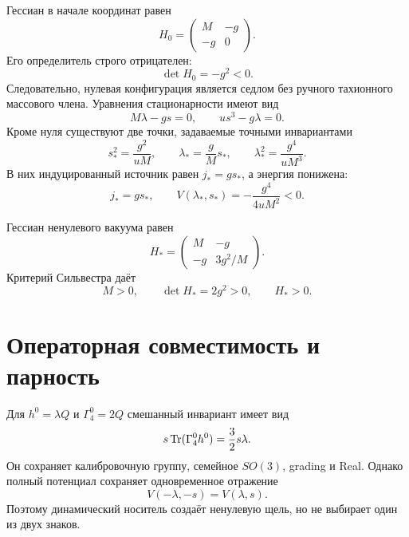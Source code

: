 Гессиан в начале координат равен
\begin{equation}
 H_0=\begin{pmatrix}M&-g\\-g&0\end{pmatrix}.
 \label{eq:v8-baryon-c0-dynamic-source-origin-hessian}
\end{equation}
Его определитель строго отрицателен:
\begin{equation}
 \det H_0=-g^2<0.
 \label{eq:v8-baryon-c0-dynamic-source-origin-instability}
\end{equation}
Следовательно, нулевая конфигурация является седлом без ручного
тахионного массового члена. Уравнения стационарности имеют вид
\begin{equation}
 M\lambda-gs=0,
 \qquad
 us^3-g\lambda=0.
 \label{eq:v8-baryon-c0-dynamic-source-stationarity}
\end{equation}
Кроме нуля существуют две точки, задаваемые точными инвариантами
\begin{equation}
 s_*^2=\frac{g^2}{uM},
 \qquad
 \lambda_* =\frac gM s_*,
 \qquad
 \lambda_*^2=\frac{g^4}{uM^3}.
 \label{eq:v8-baryon-c0-dynamic-source-nonzero-vacua}
\end{equation}
В них индуцированный источник равен $j_*=gs_*$, а энергия понижена:
\begin{equation}
 j_*=gs_*,
 \qquad
 V(\lambda_*,s_*)=-\frac{g^4}{4uM^2}<0.
 \label{eq:v8-baryon-c0-dynamic-source-induced-source-energy}
\end{equation}

Гессиан ненулевого вакуума равен
\begin{equation}
 H_*=\begin{pmatrix}
 M&-g\\
 -g&3g^2/M
 \end{pmatrix}.
 \label{eq:v8-baryon-c0-dynamic-source-vacuum-hessian}
\end{equation}
Критерий Сильвестра даёт
\begin{equation}
 M>0,
 \qquad \det H_*=2g^2>0,
 \qquad H_*>0.
 \label{eq:v8-baryon-c0-dynamic-source-vacuum-stability}
\end{equation}

\section{Операторная совместимость и парность}

Для $h^0=\lambda Q$ и $\Gamma_4^0=2Q$ смешанный инвариант имеет вид
\begin{equation}
 s\operatorname{Tr}(\Gamma_4^0h^0)=\frac32s\lambda.
 \label{eq:v8-baryon-c0-dynamic-source-marked-bilinear}
\end{equation}
Он сохраняет калибровочную группу, семейное $SO(3)$, grading и Real.
Однако полный потенциал сохраняет одновременное отражение
\begin{equation}
 V(-\lambda,-s)=V(\lambda,s).
 \label{eq:v8-baryon-c0-dynamic-source-paired-symmetry}
\end{equation}
Поэтому динамический носитель создаёт ненулевую щель, но не выбирает один
из двух знаков.

